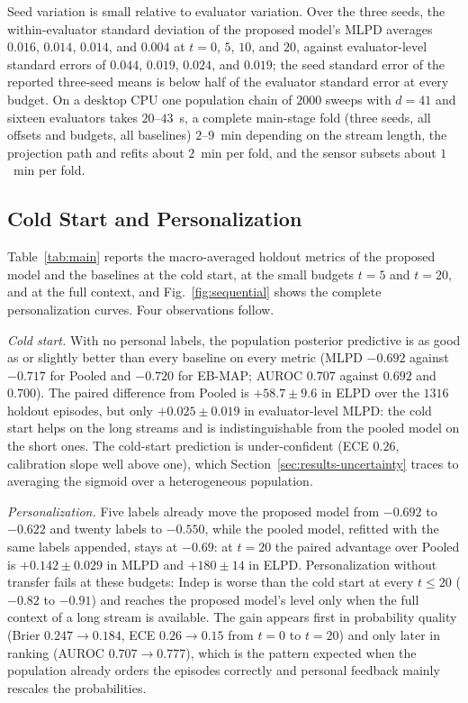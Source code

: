 \documentclass[lettersize,journal]{IEEEtran}
\newif\ifdraftnotes
\newcommand{\draftnote}[1]{\ifdraftnotes\textcolor{red}{\textbf{[TODO: #1]}}\fi}
\begin{document}
Seed variation is small relative to evaluator variation. Over the three seeds, the within-evaluator standard deviation of the proposed model's MLPD averages $0.016$, $0.014$, $0.014$, and $0.004$ at $t=0$, $5$, $10$, and $20$, against evaluator-level standard errors of $0.044$, $0.019$, $0.024$, and $0.019$; the seed standard error of the reported three-seed means is below half of the evaluator standard error at every budget. On a desktop CPU one population chain of $2000$ sweeps with $d=41$ and sixteen evaluators takes $20$--$43$~s, a complete main-stage fold (three seeds, all offsets and budgets, all baselines) $2$--$9$~min depending on the stream length, the projection path and refits about $2$~min per fold, and the sensor subsets about $1$~min per fold. \draftnote{Add hardware and software versions in Appendix~\ref{app:repro}.}

\subsection{Cold Start and Personalization}
\label{sec:results-personalization}

Table~\ref{tab:main} reports the macro-averaged holdout metrics of the proposed model and the baselines at the cold start, at the small budgets $t=5$ and $t=20$, and at the full context, and Fig.~\ref{fig:sequential} shows the complete personalization curves. Four observations follow.

\emph{Cold start.} With no personal labels, the population posterior predictive is as good as or slightly better than every baseline on every metric (MLPD $-0.692$ against $-0.717$ for Pooled and $-0.720$ for EB-MAP; AUROC $0.707$ against $0.692$ and $0.700$). The paired difference from Pooled is $+58.7\pm9.6$ in ELPD over the $1316$ holdout episodes, but only $+0.025\pm0.019$ in evaluator-level MLPD: the cold start helps on the long streams and is indistinguishable from the pooled model on the short ones. The cold-start prediction is under-confident (ECE $0.26$, calibration slope well above one), which Section~\ref{sec:results-uncertainty} traces to averaging the sigmoid over a heterogeneous population.

\emph{Personalization.} Five labels already move the proposed model from $-0.692$ to $-0.622$ and twenty labels to $-0.550$, while the pooled model, refitted with the same labels appended, stays at $-0.69$: at $t=20$ the paired advantage over Pooled is $+0.142\pm0.029$ in MLPD and $+180\pm14$ in ELPD. Personalization without transfer fails at these budgets: Indep is worse than the cold start at every $t\le20$ ($-0.82$ to $-0.91$) and reaches the proposed model's level only when the full context of a long stream is available. The gain appears first in probability quality (Brier $0.247\to0.184$, ECE $0.26\to0.15$ from $t=0$ to $t=20$) and only later in ranking (AUROC $0.707\to0.777$), which is the pattern expected when the population already orders the episodes correctly and personal feedback mainly rescales the probabilities.
\end{document}

